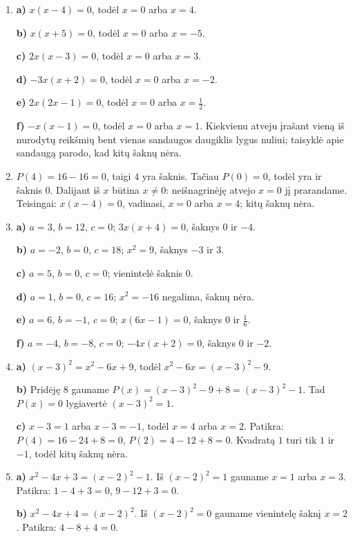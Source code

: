 \documentclass[12pt,a4paper]{article}
\begin{document}
\begin{enumerate}
\textbf{b)} Kai $t=0$, vienintelis sprendinys yra $0$. Kai $t<0$, realiųjų sprendinių nėra, nes kvadratas neneigiamas.

\textbf{c)} $3^2=9$, todėl $3$ tikrai yra sprendinys, tačiau $(-3)^2=9$. Patikrinus tik $3$ nesužinome, ar nėra kitų sprendinių; šiuo atveju dar tinka $-3$.
\item \textbf{a)} $x(x-4)=0$, todėl $x=0$ arba $x=4$.

\textbf{b)} $x(x+5)=0$, todėl $x=0$ arba $x=-5$.

\textbf{c)} $2x(x-3)=0$, todėl $x=0$ arba $x=3$.

\textbf{d)} $-3x(x+2)=0$, todėl $x=0$ arba $x=-2$.

\textbf{e)} $2x(2x-1)=0$, todėl $x=0$ arba $x=\frac{1}{2}$.

\textbf{f)} $-x(x-1)=0$, todėl $x=0$ arba $x=1$. Kiekvienu atveju įrašant vieną iš nurodytų reikšmių bent vienas sandaugos daugiklis lygus nuliui; taisyklė apie sandaugą parodo, kad kitų šaknų nėra.
\item $P(4)=16-16=0$, taigi $4$ yra šaknis. Tačiau $P(0)=0$, todėl yra ir šaknis $0$. Dalijant iš $x$ būtina $x\ne0$: neišnagrinėję atvejo $x=0$ jį prarandame. Teisingai: $x(x-4)=0$, vadinasi, $x=0$ arba $x=4$; kitų šaknų nėra.
\item \textbf{a)} $a=3$, $b=12$, $c=0$; $3x(x+4)=0$, šaknys $0$ ir $-4$.

\textbf{b)} $a=-2$, $b=0$, $c=18$; $x^2=9$, šaknys $-3$ ir $3$.

\textbf{c)} $a=5$, $b=0$, $c=0$; vienintelė šaknis $0$.

\textbf{d)} $a=1$, $b=0$, $c=16$; $x^2=-16$ negalima, šaknų nėra.

\textbf{e)} $a=6$, $b=-1$, $c=0$; $x(6x-1)=0$, šaknys $0$ ir $\frac{1}{6}$.

\textbf{f)} $a=-4$, $b=-8$, $c=0$; $-4x(x+2)=0$, šaknys $0$ ir $-2$.
\item \textbf{a)} $(x-3)^2=x^2-6x+9$, todėl $x^2-6x=(x-3)^2-9$.

\textbf{b)} Pridėję $8$ gauname $P(x)=(x-3)^2-9+8=(x-3)^2-1$. Tad $P(x)=0$ lygiavertė $(x-3)^2=1$.

\textbf{c)} $x-3=1$ arba $x-3=-1$, todėl $x=4$ arba $x=2$. Patikra: $P(4)=16-24+8=0$, $P(2)=4-12+8=0$. Kvadratą $1$ turi tik $1$ ir $-1$, todėl kitų šaknų nėra.
\item \textbf{a)} $x^2-4x+3=(x-2)^2-1$. Iš $(x-2)^2=1$ gauname $x=1$ arba $x=3$. Patikra: $1-4+3=0$, $9-12+3=0$.

\textbf{b)} $x^2-4x+4=(x-2)^2$. Iš $(x-2)^2=0$ gauname vienintelę šaknį $x=2$. Patikra: $4-8+4=0$.


\end{enumerate}
\end{document}

